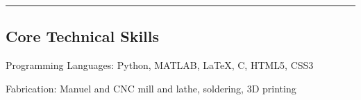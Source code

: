 \documentclass[10pt,letterpaper]{article}
\newenvironment{indentsection}[1]%
{\begin{list}{}%
	{\setlength{\leftmargin}{#1}}%
	\item[]%
}
{\end{list}}
\begin{document}

% 
% 

\hrule
\vspace{-0.4em}
\subsection*{Core Technical Skills}

\begin{indentsection}{\parindent}
\begin{description*}
	\item[Programming Languages:]
	Python, MATLAB, \LaTeX, C, HTML5, CSS3
	\item[Fabrication:]
	Manuel and CNC mill and lathe, soldering, 3D printing
\end{description*}
\end{indentsection}
\end{document}
